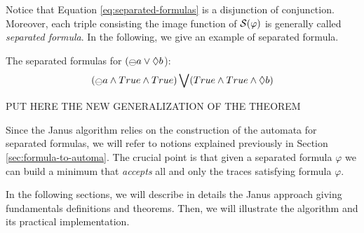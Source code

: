 Notice that Equation \ref{eq:separated-formulas} is a disjunction of conjunction. Moreover, each triple consisting the image function of $\S(\varphi)$ is generally called \emph{separated formula}. In the following, we give an example of separated formula.
\begin{example}\label{ex:separated-formulas}
The separated formulas for $(\Yesterday a \lOR \Diamond b$):
\begin{align*}
(\Yesterday a \lAND True \lAND True)\bigvee(True \lAND True \lAND \Diamond b)
\end{align*}
\end{example}
PUT HERE THE NEW GENERALIZATION OF THE THEOREM

Since the Janus algorithm relies on the construction of the automata for separated \LTLp formulas, we will refer to notions explained previously in Section \ref{sec:formula-to-automa}. The crucial point is that given a separated \LTLp formula $\varphi$ we can build a minimum \DFA that \emph{accepts} all and only the traces satisfying formula $\varphi$.

In the following sections, we will describe in details the Janus approach giving fundamentals definitions and theorems. Then, we will illustrate the algorithm and its practical implementation.
